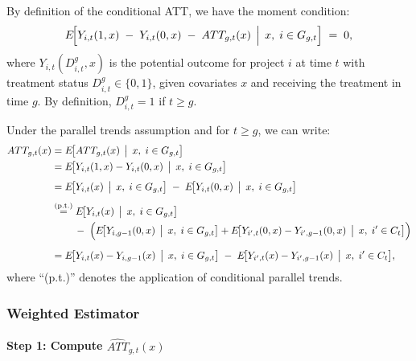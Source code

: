 \documentclass[source/paper/main.tex]{subfiles}
\begin{document}
By definition of the conditional ATT, we have the moment condition:
\[
    E\!\Bigl[
      Y_{i,t}(1, x) 
      \;-\; 
      Y_{i,t}(0, x) 
      \;-\; 
      ATT_{g,t}(x)
      \,\Bigm|\,
      x,\; i \in G_{g,t}
    \Bigr] 
    \;=\; 0,
\]
where $Y_{i,t}(D_{i,t}^g, x)$ is the potential outcome for project $i$ at time $t$ with treatment status $D_{i,t}^g \in \{0,1\}$, given covariates $x$ and receiving the treatment in time $g$. By definition, $D_{i,t}^g = 1$ if $t \ge g$.

\medskip
\noindent
Under the parallel trends assumption and for $t \ge g$, we can write:
\begin{align*}
    ATT_{g,t}(x) &= E\!\bigl[
         ATT_{g,t}(x)
       \,\bigm|\,
         x,\; i \in G_{g,t}
       \bigr]\\
    &= E\!\bigl[
         Y_{i,t}(1, x) - Y_{i,t}(0, x)
       \,\bigm|\,
         x,\; i \in G_{g,t}
       \bigr]
      \\[4pt]
    &= E\!\bigl[
         Y_{i,t}(x)
         \,\bigm|\,
         x,\; i \in G_{g,t}
       \bigr]
      \;-\;
       E\!\bigl[
         Y_{i,t}(0, x)
         \,\bigm|\,
         x,\; i \in G_{g,t}
       \bigr]
      \\[4pt]
    &\overset{\text{(p.t.)}}{=}
      E\!\bigl[
         Y_{i,t}(x)
         \,\bigm|\,
         x,\; i \in G_{g,t}
       \bigr]\\
      & \quad\quad \;-\;
      \Bigl(
         E\!\bigl[
           Y_{i,g-1}(0, x)
           \,\bigm|\,
           x,\; i \in G_{g,t}
         \bigr]
         +
         E\!\bigl[
           Y_{i',t}(0, x) 
           -
           Y_{i',g-1}(0, x)
           \,\bigm|\,
           x,\; i' \in C_t
         \bigr]
      \Bigr)
      \\[6pt]
    &= E\!\bigl[
         Y_{i,t}(x) - Y_{i,g-1}(x)
         \,\bigm|\,
         x,\; i \in G_{g,t}
       \bigr]
      \;-\;
       E\!\bigl[
         Y_{i',t}(x) - Y_{i',g-1}(x)
         \,\bigm|\,
         x,\; i' \in C_t
       \bigr],
\end{align*}
where “(p.t.)” denotes the application of conditional parallel trends.

\subsubsection{Weighted Estimator}

\paragraph{Step 1: Compute \texorpdfstring{$\widehat{ATT}_{g,t}(x)$}{ATT\_g,t(x)}}
\end{document}
